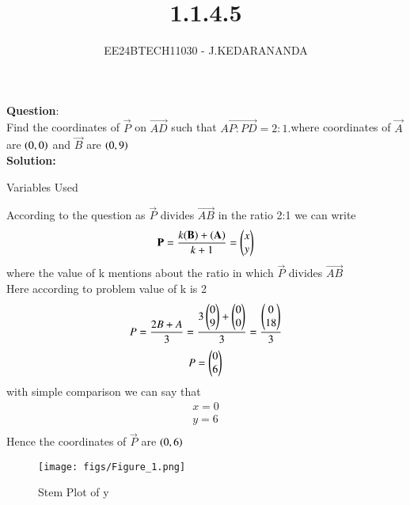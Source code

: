 \documentclass[journal]{IEEEtran}
\begin{document}

\vspace{3cm}

\title{1.1.4.5}
\author{EE24BTECH11030 - J.KEDARANANDA
}
{\let\newpage\relax\maketitle}

\renewcommand{\thefigure}{\theenumi}
\renewcommand{\thetable}{\theenumi}
\setlength{\intextsep}{10pt} %


\renewcommand{\thetable}{\theenumi}


\textbf{Question}:\\
Find the coordinates of $\vec{P}$ on $\vec{AD}$ such that $\vec{AP:PD}=2:1.$where coordinates of $\vec{A}$ are $\left(0,0\right)$ and $\vec{B}$ are $\left(0,9\right)$
\\
\textbf{Solution: }
\begin{table}[h!]    
  \centering
  
  \caption{Variables Used}
  \label{tab10.5.3.9.1}
\end{table}
According to the question as $\vec{P}$ divides $\vec{AB}$ in the ratio 2:1 we can write\\
\begin{align}
\mathbf{P}=\frac{k(\mathbf{B})+(\mathbf{A})}{k+1}=\begin{pmatrix}x\\y\end{pmatrix}\\
\end{align}
where the value of k mentions about the ratio in which $\vec{P}$ divides $\vec{AB}$\\
Here according to problem value of k is 2\\
\begin{align}
P=\frac{2B+A}{3}=\frac{3\begin{pmatrix}0\\9\end{pmatrix}+\begin{pmatrix}0\\0\end{pmatrix}}{3}=\frac{\begin{pmatrix}0\\18\end{pmatrix}}{3}\\
\end{align}
\begin{align}
P=\begin{pmatrix}0\\6\end{pmatrix}
\end{align}
with simple comparison we can say that 
\begin{align}
x=0\\
y=6\\
\end{align}
Hence the coordinates of $\vec{P}$ are $\left(0,6\right)$
\begin{figure}[h!]
   \centering
   \texttt{[image: figs/Figure\_1.png]}
   \caption{Stem Plot of y}
   \label{stemplot}
\end{figure}
\end{document}
